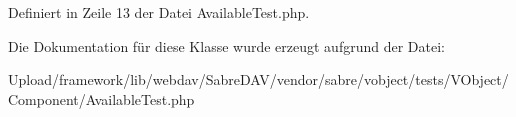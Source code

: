 Definiert in Zeile 13 der Datei Available\+Test.\+php.



Die Dokumentation für diese Klasse wurde erzeugt aufgrund der Datei\+:\begin{DoxyCompactItemize}
\item 
Upload/framework/lib/webdav/\+Sabre\+D\+A\+V/vendor/sabre/vobject/tests/\+V\+Object/\+Component/Available\+Test.\+php\end{DoxyCompactItemize}
